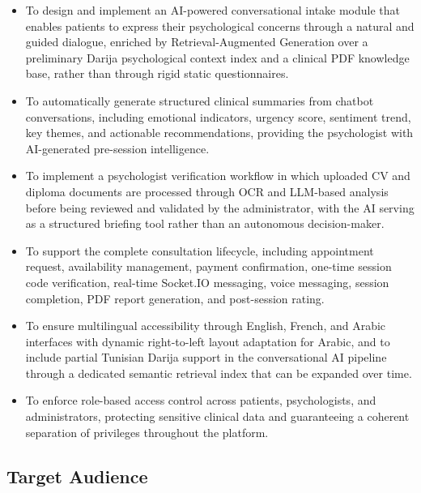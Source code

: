 \documentclass[a4paper,12pt]{report}
\begin{document}
\begin{itemize}[leftmargin=1.5cm, itemsep=6pt]
    \item[--] To design and implement an AI-powered conversational intake module that enables patients to express their psychological concerns through a natural and guided dialogue, enriched by Retrieval-Augmented Generation over a preliminary Darija psychological context index and a clinical PDF knowledge base, rather than through rigid static questionnaires.

    \item[--] To automatically generate structured clinical summaries from chatbot conversations, including emotional indicators, urgency score, sentiment trend, key themes, and actionable recommendations, providing the psychologist with AI-generated pre-session intelligence.

    \item[--] To implement a psychologist verification workflow in which uploaded CV and diploma documents are processed through OCR and LLM-based analysis before being reviewed and validated by the administrator, with the AI serving as a structured briefing tool rather than an autonomous decision-maker.

    \item[--] To support the complete consultation lifecycle, including appointment request, availability management, payment confirmation, one-time session code verification, real-time Socket.IO messaging, voice messaging, session completion, PDF report generation, and post-session rating.

    \item[--] To ensure multilingual accessibility through English, French, and Arabic interfaces with dynamic right-to-left layout adaptation for Arabic, and to include partial Tunisian Darija support in the conversational AI pipeline through a dedicated semantic retrieval index that can be expanded over time.

    \item[--] To enforce role-based access control across patients, psychologists, and administrators, protecting sensitive clinical data and guaranteeing a coherent separation of privileges throughout the platform.
\end{itemize}

\subsection{Target Audience}
\end{document}
